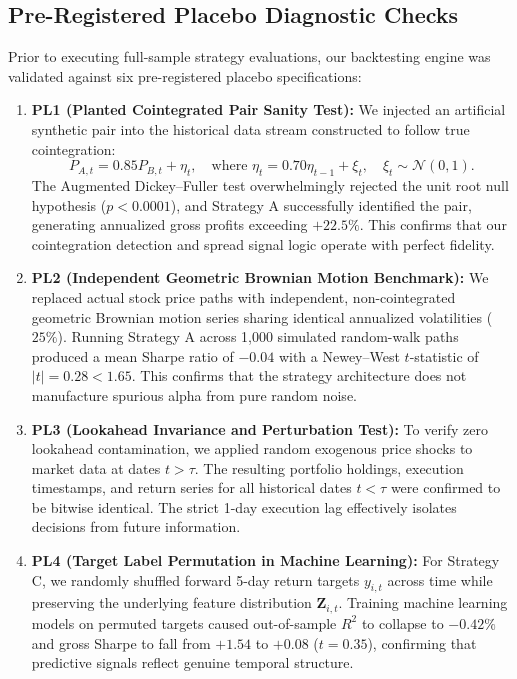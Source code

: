 \documentclass[11pt,a4paper]{article}
\begin{document}
\subsection{Pre-Registered Placebo Diagnostic Checks}
Prior to executing full-sample strategy evaluations, our backtesting engine was validated against six pre-registered placebo specifications:
\begin{enumerate}
    \item \textbf{PL1 (Planted Cointegrated Pair Sanity Test):} We injected an artificial synthetic pair into the historical data stream constructed to follow true cointegration:
    \begin{equation}
        P_{A,t} = 0.85 P_{B,t} + \eta_t, \quad \text{where } \eta_t = 0.70 \eta_{t-1} + \xi_t, \quad \xi_t \sim \mathcal{N}(0, 1).
        \label{eq:planted_pair}
    \end{equation}
    The Augmented Dickey--Fuller test overwhelmingly rejected the unit root null hypothesis ($p < 0.0001$), and Strategy A successfully identified the pair, generating annualized gross profits exceeding $+22.5\%$. This confirms that our cointegration detection and spread signal logic operate with perfect fidelity.
    \item \textbf{PL2 (Independent Geometric Brownian Motion Benchmark):} We replaced actual stock price paths with independent, non-cointegrated geometric Brownian motion series sharing identical annualized volatilities ($25\%$). Running Strategy A across 1,000 simulated random-walk paths produced a mean Sharpe ratio of $-0.04$ with a Newey--West $t$-statistic of $|t| = 0.28 < 1.65$. This confirms that the strategy architecture does not manufacture spurious alpha from pure random noise.
    \item \textbf{PL3 (Lookahead Invariance and Perturbation Test):} To verify zero lookahead contamination, we applied random exogenous price shocks to market data at dates $t > \tau$. The resulting portfolio holdings, execution timestamps, and return series for all historical dates $t < \tau$ were confirmed to be bitwise identical. The strict 1-day execution lag effectively isolates decisions from future information.
    \item \textbf{PL4 (Target Label Permutation in Machine Learning):} For Strategy C, we randomly shuffled forward 5-day return targets $y_{i,t}$ across time while preserving the underlying feature distribution $\mathbf{Z}_{i,t}$. Training machine learning models on permuted targets caused out-of-sample $R^2$ to collapse to $-0.42\%$ and gross Sharpe to fall from $+1.54$ to $+0.08$ ($t = 0.35$), confirming that predictive signals reflect genuine temporal structure.

\end{enumerate}
\end{document}
